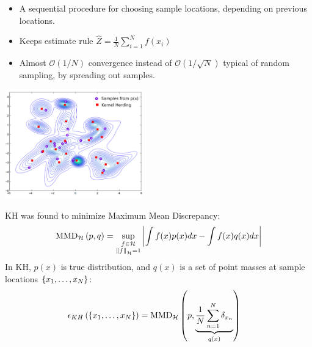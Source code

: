\documentclass[usenames,dvipsnames]{beamer}
\begin{document}
\begin{frame}[plain, t]
	\bodyheaderskip
	\slidebody
	{
		\begin{itemize}
			\item A sequential procedure for choosing sample locations, depending on previous locations.
			\pause			
			\item Keeps estimate rule $\hat{Z} = \frac{1}{N} \sum_{i=1}^N f(x_i)$
			\pause			
			\item Almost $\mathcal{O}(1/N)$ convergence instead of $\mathcal{O}(1/\sqrt{N})$ typical of random sampling, by spreading out samples.
		\end{itemize}
		\centering			
		\includegraphics[width=6cm]{figures/kh_samples_legend} \\
	}
\end{frame}



\begin{frame}[plain, t]
	\titlebodyskip
	\slidebody
	{
		KH was found to minimize Maximum Mean Discrepancy:
		\begin{align*}
			{\rm MMD}_{\mathcal{H}}\left(p,q\right) = \sup_{\substack{f\in\mathcal{H}\\\left\|f\right\|_{\mathcal{H}}=1}}\left\vert\int f(x) p(x) dx - \int f(x) q(x) dx \right\vert
		\end{align*}
		\pause
		In KH, $p(x)$ is true distribution, and $q(x)$ is a set of point masses at sample locations $\{{x}_1,\ldots,{x}_{N}\}$:
		\begin{align*}
			\epsilon_{KH}&\left(\{{x}_1,\ldots,{x}_{N}\}\right) = 
			{\rm MMD}_{\mathcal{H}}\left(p, \underbrace{\frac{1}{N}\sum_{n=1}^{N}\delta_{x_n}}_{q(x)}\right)
		\end{align*}
	}
\end{frame}
\end{document}
